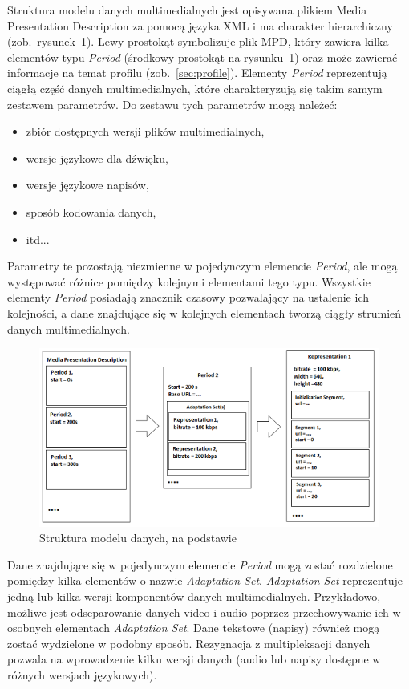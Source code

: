 Struktura modelu danych multimedialnych jest opisywana plikiem Media Presentation Description za pomocą języka XML i ma charakter hierarchiczny (zob.~rysunek~\ref{fig:mpd}). Lewy prostokąt symbolizuje plik MPD, który zawiera kilka elementów typu \textit{Period} (środkowy prostokąt na rysunku~\ref{fig:mpd}) oraz może zawierać informacje na temat profilu (zob.~\ref{sec:profile}). Elementy \textit{Period} reprezentują ciągłą część danych multimedialnych, które charakteryzują się takim samym zestawem parametrów. Do zestawu tych parametrów mogą należeć:
\begin{itemize}
	\item zbiór dostępnych wersji plików multimedialnych,
	\item wersje językowe dla dźwięku,
	\item wersje językowe napisów,
	\item sposób kodowania danych,
	\item itd...
\end{itemize}
Parametry te pozostają niezmienne w pojedynczym elemencie \textit{Period}, ale mogą występować różnice pomiędzy kolejnymi elementami tego typu.
Wszystkie elementy \textit{Period} posiadają znacznik czasowy pozwalający na ustalenie ich kolejności, a dane znajdujące się w kolejnych elementach tworzą ciągły strumień danych multimedialnych.

\begin{figure}
	\centering
		\includegraphics[width=\linewidth]{mpd}
	\caption{Struktura modelu danych, na podstawie~\cite{ISO-IEC-DASH}}
	\label{fig:mpd}
\end{figure}

Dane znajdujące się w pojedynczym elemencie \textit{Period} mogą zostać rozdzielone pomiędzy kilka elementów o nazwie \textit{Adaptation Set}. \textit{Adaptation Set} reprezentuje jedną lub kilka wersji komponentów danych multimedialnych. Przykładowo, możliwe jest odseparowanie danych video i audio poprzez przechowywanie ich w osobnych elementach \textit{Adaptation Set}. Dane tekstowe (napisy) również mogą zostać wydzielone w podobny sposób. Rezygnacja z multipleksacji danych pozwala na wprowadzenie kilku wersji danych (audio lub napisy dostępne w różnych wersjach językowych).

